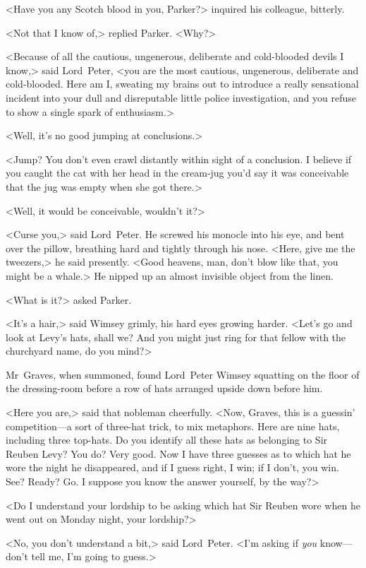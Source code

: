 <Have you any Scotch blood in you, Parker?> inquired his colleague, bitterly.

<Not that I know of,> replied Parker. <Why?>

<Because of all the cautious, ungenerous, deliberate and cold-blooded devils I know,> said Lord~Peter, <you are the most cautious, ungenerous, deliberate and cold-blooded. Here am I\@, sweating my brains out to introduce a really sensational incident into your dull and disreputable little police investigation, and you refuse to show a single spark of enthusiasm.>

<Well, it's no good jumping at conclusions.>

<Jump? You don't even crawl distantly within sight of a conclusion. I believe if you caught the cat with her head in the cream-jug you'd say it was conceivable that the jug was empty when she got there.>

<Well, it would be conceivable, wouldn't it?>

<Curse you,> said Lord~Peter. He screwed his monocle into his eye, and bent over the pillow, breathing hard and tightly through his nose. <Here, give me the tweezers,> he said presently. <Good heavens, man, don't blow like that, you might be a whale.> He nipped up an almost invisible object from the linen.

<What is it?> asked Parker.

<It's a hair,> said Wimsey grimly, his hard eyes growing harder. <Let's go and look at Levy's hats, shall we? And you might just ring for that fellow with the churchyard name, do you mind?>

Mr~Graves, when summoned, found Lord~Peter Wimsey squatting on the floor of the dressing-room before a row of hats arranged upside down before him.

<Here you are,> said that nobleman cheerfully. <Now, Graves, this is a guessin' competition—a sort of three-hat trick, to mix metaphors. Here are nine hats, including three top-hats. Do you identify all these hats as belonging to Sir Reuben Levy? You do? Very good. Now I have three guesses as to which hat he wore the night he disappeared, and if I guess right, I win; if I don't, you win. See? Ready? Go. I suppose you know the answer yourself, by the way?>

<Do I understand your lordship to be asking which hat Sir Reuben wore when he went out on Monday night, your lordship?>

<No, you don't understand a bit,> said Lord~Peter. <I'm asking if \emph{you} know—don't tell me, I'm going to guess.>


